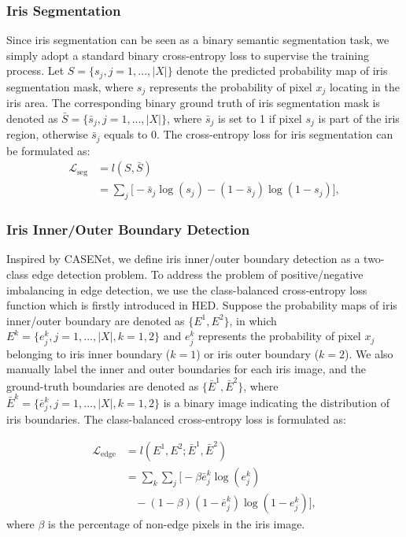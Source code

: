 \documentclass[journal]{IEEEtran}
\begin{document}
\subsubsection{Iris Segmentation}
Since iris segmentation can be seen as a binary semantic segmentation task, we simply adopt a standard binary cross-entropy loss to supervise the training process.
Let $S = \{s_{j}, j=1,...,|X|\}$ denote the predicted probability map of iris segmentation mask, where $s_{j}$ represents the probability of pixel $x_j$ locating in the iris area.
The corresponding binary ground truth of iris segmentation mask is denoted as  $\bar{S} = \{\bar{s}_{j}, j=1,...,|X|\}$, where $\bar{s}_{j}$ is set to 1 if pixel ${s}_{j}$ is part of the iris region, otherwise $\bar{s}_{j}$ equals to 0. The cross-entropy loss for iris segmentation can be formulated as:
\begin{equation}
\begin{split}
\mathcal{L}_{\text{seg}} &= l(S,\bar{S})\\
  &=\sum_{j}\Big[-\bar{s}_{j}\log(s_{j})-(1-\bar{s}_{j})\log(1-s_{j})\Big],
\end{split}
\label{eq:pupil_loss}
\end{equation}

\subsubsection{Iris Inner/Outer Boundary Detection}
Inspired by CASENet\cite{yu2017casenet}, we define iris inner/outer boundary detection as a two-class edge detection problem. To address the problem of positive/negative imbalancing in edge detection, we use the class-balanced cross-entropy loss function which is firstly introduced in HED\cite{xie2015hed}. Suppose the probability maps of iris inner/outer boundary are denoted as $\{E^{1},E^{2}\}$, in which $E^{k}=\{e_{j}^{k}, j=1,...,|X|,k=1,2\}$ and $e_{j}^{k}$ represents the probability of pixel $x_j$ belonging to iris inner boundary ($k=1$) or iris outer boundary ($k=2$). We also manually label the inner and outer boundaries for each iris image, and the ground-truth boundaries are denoted as $\{\bar{E}^{1},\bar{E}^{2}\}$, where $\bar{E}^{k}=\{\bar{e}_{j}^{k}, j=1,...,|X|,k=1,2\}$ is a binary image indicating the distribution of iris boundaries.  The class-balanced cross-entropy loss is formulated as:

\begin{equation}
\begin{split}
\mathcal{L}_{\text{edge}}&=l(E^{1},E^{2};\bar{E}^{1},\bar{E}^{2})\\
  &=\sum_k \sum_j \Big[ -\beta \bar{e}_{j}^{k}\log(e_{j}^{k})\\
  &~~~~-(1-\beta)(1-\bar{e}_{j}^{k})\log(1-e_{j}^{k})\Big],
\end{split}
\label{eq:edgeloss}
\end{equation}
where $\beta$ is the percentage of non-edge pixels in the iris image.
\end{document}
